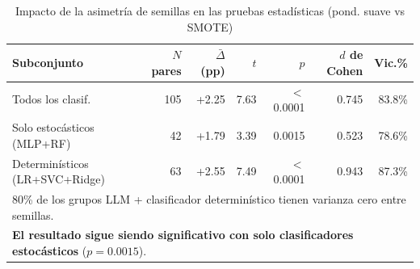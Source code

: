 \begin{table}[htbp]
\centering
\caption{Impacto de la asimetría de semillas en las pruebas estadísticas (pond. suave vs SMOTE)}
\label{tab:seed_asymmetry}
\small
\begin{tabular}{lrrrrrr}
\toprule
\textbf{Subconjunto} & \textbf{$N$ pares} & \textbf{$\bar{\Delta}$ (pp)} & \textbf{$t$} & \textbf{$p$} & \textbf{$d$ de Cohen} & \textbf{Vic.\%} \\
\midrule
Todos los clasif.       & 105 & +2.25 & 7.63  & $<$0.0001 & 0.745 & 83.8\% \\
Solo estocásticos (MLP+RF)  & 42  & +1.79 & 3.39  & 0.0015    & 0.523 & 78.6\% \\
Determinísticos (LR+SVC+Ridge) & 63  & +2.55 & 7.49  & $<$0.0001 & 0.943 & 87.3\% \\
\midrule
\multicolumn{7}{l}{\small 80\% de los grupos LLM + clasificador determinístico tienen varianza cero entre semillas.} \\
\multicolumn{7}{l}{\small \textbf{El resultado sigue siendo significativo con solo clasificadores estocásticos} ($p=0.0015$).} \\
\bottomrule
\end{tabular}
\end{table}
